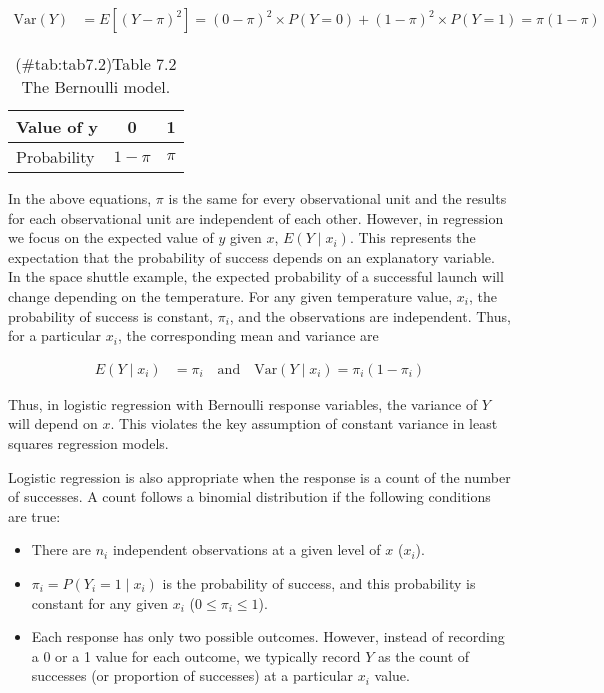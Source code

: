\documentclass[
]{report}
\providecommand{\tightlist}{%
  \setlength{\itemsep}{0pt}\setlength{\parskip}{0pt}}
\begin{document}
\begin{align}
\mathrm{Var}(Y) &= E[(Y - \pi)^2] = (0 - \pi)^2 \times P(Y = 0) + (1 - \pi)^2 \times P(Y = 1) = \pi (1 - \pi) \tag{7.19}
\end{align}

\begin{table}[!h]
\centering
\caption{(\#tab:tab7.2)Table 7.2 The Bernoulli model.}
\centering
\begin{tabular}[t]{lcc}
\toprule
Value of y & 0 & 1\\
\midrule
Probability & $1 - \pi$ & $\pi$\\
\bottomrule
\end{tabular}
\end{table}

In the above equations, \(\pi\) is the same for every observational unit and the results for each observational unit are independent of each other. However, in regression we focus on the expected value of \(y\) given \(x\), \(E(Y \mid x_i)\). This represents the expectation that the probability of success depends on an explanatory variable. In the space shuttle example, the expected probability of a successful launch will change depending on the temperature. For any given temperature value, \(x_i\), the probability of success is constant, \(\pi_i\), and the observations are independent. Thus, for a particular \(x_i\), the corresponding mean and variance are

\begin{align}
E(Y \mid x_i) &= \pi_i \quad \text{and} \quad \mathrm{Var}(Y \mid x_i) = \pi_i (1 - \pi_i) 
\tag{7.20}
\end{align}

Thus, in logistic regression with Bernoulli response variables, the variance of \(Y\) will depend on \(x\). This violates
the key assumption of constant variance in least squares regression models.

Logistic regression is also appropriate when the response is a count of the number of successes. A count follows a binomial distribution if the following conditions are true:

\begin{itemize}
\tightlist
\item
  There are \(n_i\) independent observations at a given level of \(x\) (\(x_i\)).
\item
  \(\pi_i = P(Y_i = 1 \mid x_i)\) is the probability of success, and this probability is constant for any given \(x_i\) (\(0 \le \pi_i \le 1\)).
\item
  Each response has only two possible outcomes. However, instead of recording a 0 or a 1 value for each outcome, we typically record \(Y\) as the count of successes (or proportion of successes) at a particular \(x_i\) value.
\end{itemize}
\end{document}
